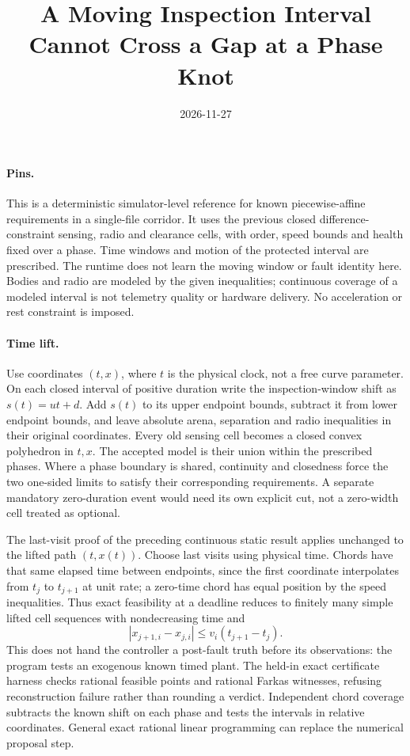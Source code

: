 \documentclass[11pt]{article}
\title{A Moving Inspection Interval Cannot Cross a Gap at a Phase Knot}
\date{2026-11-27}
\begin{document}
\maketitle

\paragraph{Pins.}
This is a deterministic simulator-level reference for known
piecewise-affine requirements in a single-file corridor. It uses the
previous closed difference-constraint sensing, radio and clearance
cells, with order, speed bounds and health fixed over a phase. Time
windows and motion of the protected interval are prescribed. The
runtime does not learn the moving window or fault identity here.
Bodies and radio are modeled by the given inequalities; continuous
coverage of a modeled interval is not telemetry quality or hardware
delivery. No acceleration or rest constraint is imposed.

\paragraph{Time lift.}
Use coordinates \((t,x)\), where \(t\) is the physical clock, not a
free curve parameter. On each closed interval of positive duration
write the inspection-window shift as \(s(t)=u t+d\). Add \(s(t)\)
to its upper endpoint bounds, subtract it from lower endpoint bounds,
and leave absolute arena, separation and radio inequalities in
their original coordinates. Every old sensing cell becomes a closed
convex polyhedron in \(t,x\). The accepted model is their union
within the prescribed phases. Where a phase boundary is shared,
continuity and closedness force the two one-sided limits to
satisfy their corresponding requirements. A separate mandatory
zero-duration event would need its own explicit cut, not a
zero-width cell treated as optional.

The last-visit proof of the preceding continuous static result
applies unchanged to the lifted path \((t,x(t))\). Choose last
visits using physical time. Chords have that same elapsed time
between endpoints, since the first coordinate interpolates from
\(t_j\) to \(t_{j+1}\) at unit rate; a zero-time chord has equal
position by the speed inequalities. Thus exact feasibility at a
deadline reduces to finitely many simple lifted cell sequences with
nondecreasing time and
\[
 |x_{j+1,i}-x_{j,i}|\le v_i(t_{j+1}-t_j).
\]
This does not hand the controller a post-fault truth before its
observations: the program tests an exogenous known timed plant.
The held-in exact certificate harness checks rational feasible
points and rational Farkas witnesses, refusing reconstruction
failure rather than rounding a verdict. Independent chord coverage
subtracts the known shift on each phase and tests the intervals
in relative coordinates. General exact rational linear programming
can replace the numerical proposal step.
\end{document}
